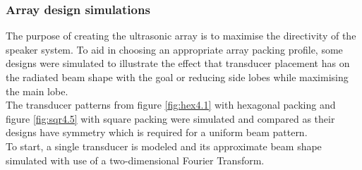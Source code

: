 \newpage
\subsubsection{Array design simulations}
The purpose of creating the ultrasonic array is to maximise the directivity of the speaker system. To aid in choosing an appropriate array packing profile, some designs were simulated to illustrate the effect that transducer placement has on the radiated beam shape with the goal or reducing side lobes while maximising the main lobe.\\
The transducer patterns from figure \ref{fig:hex4.1} with hexagonal packing and figure \ref{fig:sqr4.5} with square packing were simulated and compared as their designs have symmetry which is required for a uniform beam pattern.\\
To start, a single transducer is modeled and its approximate beam shape simulated with use of a two-dimensional Fourier Transform.

